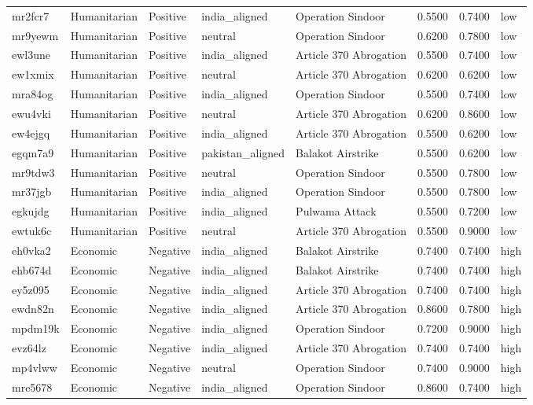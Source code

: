 \begin{longtable}{lllllrrl}
mr2fcr7 & Humanitarian & Positive & india\_aligned & Operation Sindoor & 0.5500 & 0.7400 & low \\
mr9yewm & Humanitarian & Positive & neutral & Operation Sindoor & 0.6200 & 0.7800 & low \\
ewl3une & Humanitarian & Positive & india\_aligned & Article 370 Abrogation & 0.5500 & 0.7400 & low \\
ew1xmix & Humanitarian & Positive & neutral & Article 370 Abrogation & 0.6200 & 0.6200 & low \\
mra84og & Humanitarian & Positive & india\_aligned & Operation Sindoor & 0.5500 & 0.7400 & low \\
ewu4vki & Humanitarian & Positive & neutral & Article 370 Abrogation & 0.6200 & 0.8600 & low \\
ew4ejgq & Humanitarian & Positive & india\_aligned & Article 370 Abrogation & 0.5500 & 0.6200 & low \\
egqm7a9 & Humanitarian & Positive & pakistan\_aligned & Balakot Airstrike & 0.5500 & 0.6200 & low \\
mr9tdw3 & Humanitarian & Positive & neutral & Operation Sindoor & 0.5500 & 0.7800 & low \\
mr37jgb & Humanitarian & Positive & india\_aligned & Operation Sindoor & 0.5500 & 0.7800 & low \\
egkujdg & Humanitarian & Positive & india\_aligned & Pulwama Attack & 0.5500 & 0.7200 & low \\
ewtuk6c & Humanitarian & Positive & neutral & Article 370 Abrogation & 0.5500 & 0.9000 & low \\
eh0vka2 & Economic & Negative & india\_aligned & Balakot Airstrike & 0.7400 & 0.7400 & high \\
ehb674d & Economic & Negative & india\_aligned & Balakot Airstrike & 0.7400 & 0.7400 & high \\
ey5z095 & Economic & Negative & india\_aligned & Article 370 Abrogation & 0.7400 & 0.7400 & high \\
ewdn82n & Economic & Negative & india\_aligned & Article 370 Abrogation & 0.8600 & 0.7800 & high \\
mpdm19k & Economic & Negative & india\_aligned & Operation Sindoor & 0.7200 & 0.9000 & high \\
evz64lz & Economic & Negative & india\_aligned & Article 370 Abrogation & 0.7400 & 0.7400 & high \\
mp4vlww & Economic & Negative & neutral & Operation Sindoor & 0.7400 & 0.9000 & high \\
mre5678 & Economic & Negative & india\_aligned & Operation Sindoor & 0.8600 & 0.7400 & high \\

\end{longtable}
